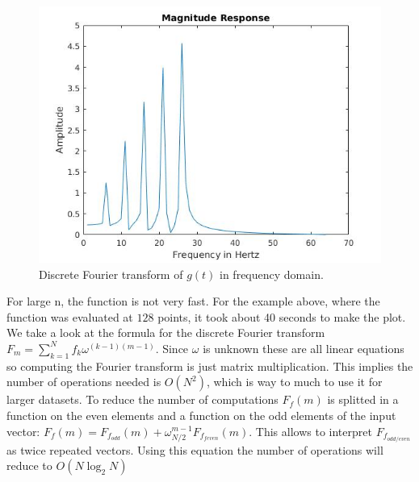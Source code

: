 \documentclass[12pt]{article}
\begin{document}
%
\begin{figure}[H]
\centering
\includegraphics[width=0.6\linewidth,natwidth=610,natheight=642]{ex3_func_wiki_1_four.jpg}
\caption{Discrete Fourier transform of $g(t)$ in frequency domain.}
\label{fig3_1}
\end{figure}

For large n, the function is not very fast. For the example above, where the function was evaluated at $128$ points, it took about 40 seconds to make the plot. We take a look at the formula for the discrete Fourier transform $F_m = \sum_{k=1}^{N}f_k\omega^{(k-1)(m-1)}$. Since $\omega$ is unknown these are all linear equations so computing the Fourier transform is just matrix multiplication. This implies the number of operations needed is $O(N^2)$, which is way to much to use it for larger datasets. To reduce the number of computations $F_f(m)$ is splitted in a function on the even elements and a function on the odd elements of the input vector: $F_f(m) = F_{f_{odd}}(m) + \omega_{N/2}^{m-1}F_{f_{feven}}(m).$ This allows to interpret $F_{f_{odd/even}}$ as twice repeated vectors. Using this equation the number of operations will reduce to $O(N \log_2 N)$


\end{document}
